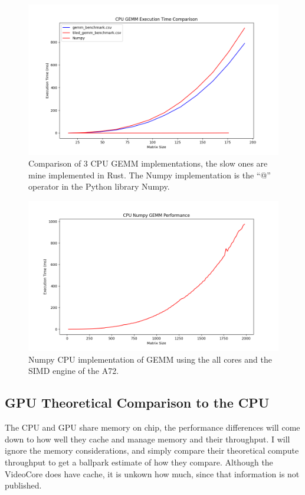 \documentclass[12pt]{article}
\begin{document}
\begin{figure}[h]
\centering
\includegraphics[width=1.0\textwidth]{gemm.png} %
\caption{Comparison of 3 CPU GEMM implementations, the slow ones are mine implemented in Rust. The Numpy implementation is the ``@'' operator in the Python library Numpy.}
\label{fig:gemm}
\end{figure}

\begin{figure}[h]
\centering
\includegraphics[width=1.0\textwidth]{gemm_numpy.png} %
\caption{Numpy CPU implementation of GEMM using the all cores and the SIMD engine of the A72.}
\label{fig:gemm_numpy}
\end{figure}

\subsection{GPU Theoretical Comparison to the CPU}
The CPU and GPU share memory on chip, the performance differences will come down to how well they cache and manage memory and their throughput. I will ignore the memory considerations, and simply compare their theoretical compute throughput to get a ballpark estimate of how they compare. Although the VideoCore does have cache, it is unkown how much, since that information is not published.
\end{document}
